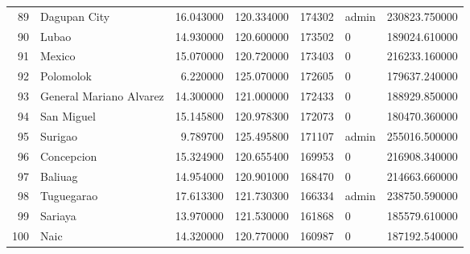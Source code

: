 \begin{longtable}{rlrrrlr}
89 & Dagupan City & 16.043000 & 120.334000 & 174302 & admin & 230823.750000 \\
90 & Lubao & 14.930000 & 120.600000 & 173502 & 0 & 189024.610000 \\
91 & Mexico & 15.070000 & 120.720000 & 173403 & 0 & 216233.160000 \\
92 & Polomolok & 6.220000 & 125.070000 & 172605 & 0 & 179637.240000 \\
93 & General Mariano Alvarez & 14.300000 & 121.000000 & 172433 & 0 & 188929.850000 \\
94 & San Miguel & 15.145800 & 120.978300 & 172073 & 0 & 180470.360000 \\
95 & Surigao & 9.789700 & 125.495800 & 171107 & admin & 255016.500000 \\
96 & Concepcion & 15.324900 & 120.655400 & 169953 & 0 & 216908.340000 \\
97 & Baliuag & 14.954000 & 120.901000 & 168470 & 0 & 214663.660000 \\
98 & Tuguegarao & 17.613300 & 121.730300 & 166334 & admin & 238750.590000 \\
99 & Sariaya & 13.970000 & 121.530000 & 161868 & 0 & 185579.610000 \\
100 & Naic & 14.320000 & 120.770000 & 160987 & 0 & 187192.540000 \\
\end{longtable}
